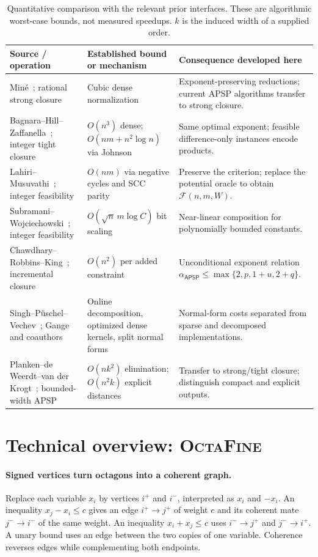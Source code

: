 \documentclass[manuscript,11pt,screen,nonacm]{acmart}
\theoremstyle{definition}
\newcommand{\AP}{\mathsf{APSP}}
\newcommand{\Ftime}{\mathcal F(n,m,W)}
\newcommand{\OctaFine}{\textsc{OctaFine}}
\begin{document}
\begin{table}[H]
\caption{Quantitative comparison with the relevant prior interfaces. These are algorithmic worst-case bounds, not measured speedups. $k$ is the induced width of a supplied order.}
\label{tab:prior}
\begin{tabularx}{\textwidth}{@{}P{.28\textwidth}P{.27\textwidth}Y@{}}
\toprule
Source / operation & Established bound or mechanism & Consequence developed here \\
\midrule
Min\'e~\cite{mine2006}; rational strong closure & Cubic dense normalization & Exponent-preserving reductions; current APSP algorithms transfer to strong closure.\\
Bagnara--Hill--Zaffanella~\cite{bhz2008}; integer tight closure & $O(n^3)$ dense; $O(nm+n^2\log n)$ via Johnson & Same optimal exponent; feasible difference-only instances encode products.\\
Lahiri--Musuvathi~\cite{lm2005}; integer feasibility & $O(nm)$ via negative cycles and SCC parity & Preserve the criterion; replace the potential oracle to obtain $\Ftime$.\\
Subramani--Wojciechowski~\cite{subramani2023}; integer feasibility & $O(\sqrt n\,m\log C)$ bit scaling & Near-linear composition for polynomially bounded constants.\\
Chawdhary--Robbins--King~\cite{crk2019}; incremental closure & $O(n^2)$ per added constraint & Unconditional exponent relation $\alpha_{\AP}\leq\max\{2,p,1+u,2+q\}$.\\
Singh--P\"uschel--Vechev~\cite{spv2015}; Gange and coauthors~\cite{gange2016,gange2021} & Online decomposition, optimized dense kernels, split normal forms & Normal-form costs separated from sparse and decomposed implementations.\\
Planken--de Weerdt--van der Krogt~\cite{planken2012}; bounded-width APSP & $O(nk^2)$ elimination; $O(n^2k)$ explicit distances & Transfer to strong/tight closure; distinguish compact and explicit outputs.\\
\bottomrule
\end{tabularx}
\end{table}

\section{Technical overview: \OctaFine}\label{sec:overview}
\paragraph{Signed vertices turn octagons into a coherent graph.}
Replace each variable $x_i$ by vertices $i^+$ and $i^-$, interpreted as $x_i$ and $-x_i$. An inequality $x_j-x_i\leq c$ gives an edge $i^+\to j^+$ of weight $c$ and its coherent mate $j^-\to i^-$ of the same weight. An inequality $x_i+x_j\leq c$ uses $i^-\to j^+$ and $j^-\to i^+$. A unary bound uses an edge between the two copies of one variable. Coherence reverses edges while complementing both endpoints.
\end{document}
